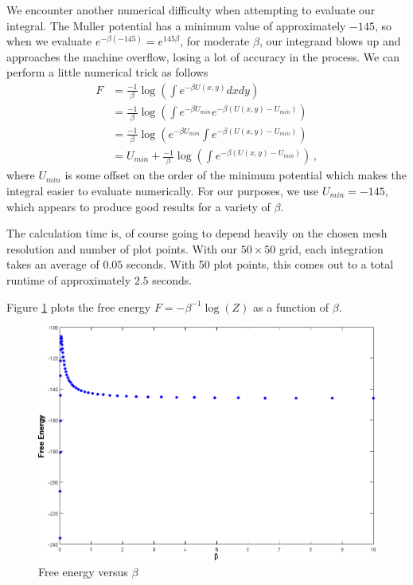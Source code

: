 \documentclass[letterpaper]{article}
\begin{document}
We encounter another numerical difficulty when attempting to evaluate our
integral. The Muller potential has a minimum value of approximately $-145$, so
when we evaluate $e^{-\beta(-145)}=e^{145\beta}$, for moderate $\beta$, our
integrand blows up and approaches the machine overflow, losing a lot of accuracy
in the process. We can perform a little numerical trick as follows
\begin{align*}
F&=\frac{-1}{\beta}\log\left(\int e^{-\beta U(x,y)}dxdy\right)\\
&=\frac{-1}{\beta}\log\left(\int e^{-\beta U_{min}}e^{-\beta
(U(x,y)-U_{min})}\right)\\
&=\frac{-1}{\beta}\log\left(e^{-\beta U_{min}}\int e^{-\beta
(U(x,y)-U_{min})}\right)\\
&=U_{min}+\frac{-1}{\beta}\log\left(\int e^{-\beta
(U(x,y)-U_{min})}\right)\,,
\end{align*}
where $U_{min}$ is some offset on the order of the minimum potential which makes
the integral easier to evaluate numerically. For our purposes, we use
$U_{min}=-145$, which appears to produce good results for a variety of $\beta$.

The calculation time is, of course going to depend heavily on the chosen mesh
resolution and number of plot points. With our $50\times50$ grid, each
integration takes an average of $0.05$ seconds. With 50 plot points, this comes
out to a total runtime of approximately $2.5$ seconds.

Figure \ref{fig:freeenergy} plots the free energy $F=-\beta^{-1}\log(Z)$ as a
function of $\beta$.
\begin{figure}[h]
\begin{center}
\includegraphics[width=5in,keepaspectratio]{FreeEnergy.png}
\end{center}
\caption{Free energy versus $\beta$}
\label{fig:freeenergy}
\end{figure}

\newpage 
\clearpage

\end{document}
